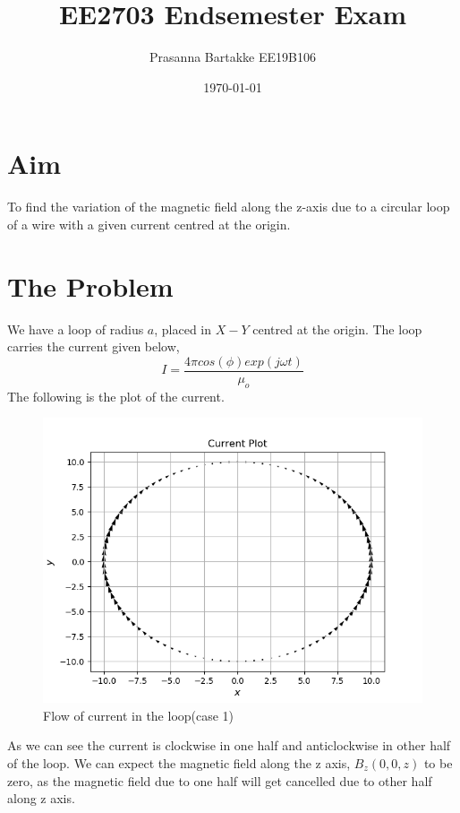 \documentclass[11pt, a4paper]{article}
\title{EE2703 Endsemester Exam} %
\author{Prasanna Bartakke EE19B106} %
\date{\today} %
\begin{document}
		
		
\maketitle %
\section{Aim}
To find the variation of the magnetic field along the z-axis due to a circular loop of a wire with a given current centred at the origin.
\section{The Problem}
We have a loop of radius $a$, placed in $X-Y$ centred at the origin. The loop carries the current given below,
\begin{equation}\label{eq:1}
I = \frac{4\pi cos(\phi)exp(j\omega t)}{\mu_o}
\end{equation}
The following is the plot of the current.
\begin{figure}[!tbh]
   	\centering
   	\includegraphics[scale=0.5]{fig1.png}  %
   	\caption{Flow of current in the loop(case 1)}
   	\label{fig:sample}
   \end{figure} 
   
 As we can see the current is clockwise in one half and anticlockwise in other half of the loop. We can expect the magnetic field along the z axis, $B_z(0, 0, z)$ to be zero, as the magnetic field due to one half will get cancelled due to other half along z axis.
 
\end{document}
